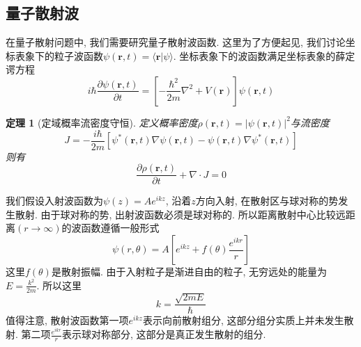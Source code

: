 \documentclass[a4paper,11pt]{book}
\newtheorem{theorem}{\hspace{2em}定理}[section]
\begin{document}
\subsection{量子散射波}
在量子散射问题中, 我们需要研究量子散射波函数. 这里为了方便起见, 我们讨论坐标表象下的粒子波函数$\psi(\mathbf{r},t)=\langle\mathbf{r}|\psi\rangle$. 坐标表象下的波函数满足坐标表象的薛定谔方程
\begin{equation}
  i\hbar\frac{\partial\psi(\mathbf{r},t)}{\partial t}=\left[-\frac{\hbar^2}{2m}\nabla^2+V(\mathbf{r})\right]\psi(\mathbf{r},t)
\end{equation}
\begin{theorem}[定域概率流密度守恒]
  定义概率密度$\rho(\mathbf{r},t)=|\psi(\mathbf{r},t)|^2$与流密度
  \begin{equation}
    J=-\frac{i\hbar}{2m}\left[\psi^*(\mathbf{r},t)\nabla\psi(\mathbf{r},t)-\psi(\mathbf{r},t)\nabla\psi^*(\mathbf{r},t)\right]
  \end{equation}
  则有
  \begin{equation}
    \frac{\partial\rho(\mathbf{r},t)}{\partial t}+\nabla\cdot J=0
  \end{equation}
\end{theorem}
我们假设入射波函数为$\psi(z)=Ae^{ikz}$, 沿着$z$方向入射, 在散射区与球对称的势发生散射. 由于球对称的势, 出射波函数必须是球对称的. 所以距离散射中心比较远距离$(r\to\infty)$的波函数遵循一般形式
\begin{equation}
  \psi(r,\theta)=A\left[e^{ikz}+f(\theta)\frac{e^{ikr}}{r}\right]
\end{equation}
这里$f(\theta)$是散射振幅. 由于入射粒子是渐进自由的粒子, 无穷远处的能量为$E=\frac{k^2}{2m}$. 所以这里
\begin{equation}
  k=\frac{\sqrt{2mE}}{\hbar}
\end{equation}
值得注意, 散射波函数第一项$e^{ikz}$表示向前散射组分, 这部分组分实质上并未发生散射. 第二项$\frac{e^{ikr}}{r}$表示球对称部分, 这部分是真正发生散射的组分.
\end{document}
